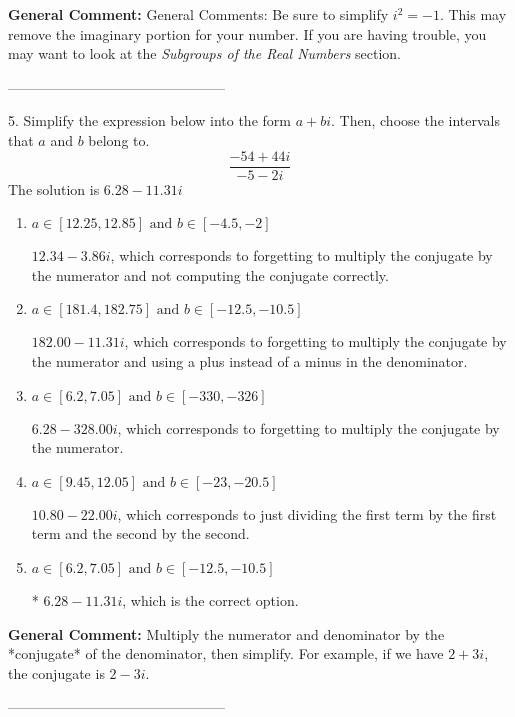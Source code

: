 \documentclass{extbook}[14pt]
\begin{document}
\textbf{General Comment:} General Comments: Be sure to simplify $i^2 = -1$. This may remove the imaginary portion for your number. If you are having trouble, you may want to look at the \textit{Subgroups of the Real Numbers} section. 

-----------------------------------------------

5. Simplify the expression below into the form $a+bi$. Then, choose the intervals that $a$ and $b$ belong to.
\[ \frac{-54 + 44 i}{-5 - 2 i} \] 
The solution is $ 6.28  - 11.31 i $ 

\begin{enumerate}[label=\Alph*.] 
\item $ a \in [12.25, 12.85] \text{ and } b \in [-4.5, -2] $ 

  $12.34  - 3.86 i$, which corresponds to forgetting to multiply the conjugate by the numerator and not computing the conjugate correctly. 
\item $ a \in [181.4, 182.75] \text{ and } b \in [-12.5, -10.5] $ 

  $182.00  - 11.31 i$, which corresponds to forgetting to multiply the conjugate by the numerator and using a plus instead of a minus in the denominator. 
\item $ a \in [6.2, 7.05] \text{ and } b \in [-330, -326] $ 

  $6.28  - 328.00 i$, which corresponds to forgetting to multiply the conjugate by the numerator. 
\item $ a \in [9.45, 12.05] \text{ and } b \in [-23, -20.5] $ 

  $10.80  - 22.00 i$, which corresponds to just dividing the first term by the first term and the second by the second. 
\item $ a \in [6.2, 7.05] \text{ and } b \in [-12.5, -10.5] $ 

 * $6.28  - 11.31 i$, which is the correct option. 
\end{enumerate} 
 
\textbf{General Comment:} Multiply the numerator and denominator by the *conjugate* of the denominator, then simplify. For example, if we have $2+3i$, the conjugate is $2-3i$. 

-----------------------------------------------
\end{document}
